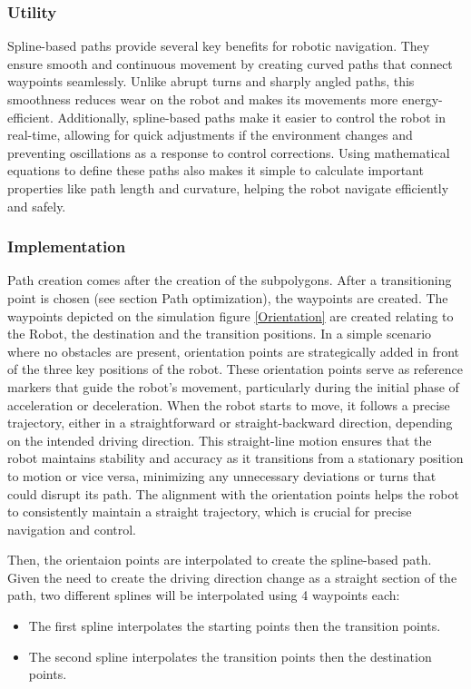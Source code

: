 \subsubsection{Utility}

Spline-based paths provide several key benefits for robotic navigation. They ensure smooth and continuous movement by 
creating curved paths that connect waypoints seamlessly. Unlike abrupt turns and sharply angled paths, this smoothness 
reduces wear on the robot and makes its movements more energy-efficient. Additionally, spline-based paths make it 
easier to control the robot in real-time, allowing for quick adjustments if the environment changes and preventing 
oscillations as a response to control corrections. Using mathematical 
equations to define these paths also makes it simple to calculate important 
properties like path length and curvature, helping the robot navigate efficiently and safely. 

\subsubsection{Implementation}

Path creation comes after the creation of the subpolygons. After a transitioning point is chosen (see section %
Path optimization), the waypoints are created. The waypoints depicted on the simulation figure \ref{Orientation} are created relating to the 
Robot, the destination and the transition positions. In a simple scenario where no obstacles are present, orientation points 
are strategically added in front of the three key positions of the robot. These orientation points serve as reference markers 
that guide the robot's movement, particularly during the initial phase of acceleration or deceleration. When the robot starts 
to move, it follows a precise trajectory, either in a straightforward or straight-backward direction, depending on the 
intended driving direction. This straight-line motion ensures that the robot maintains stability and accuracy as it 
transitions from a stationary position to motion or vice versa, minimizing any unnecessary deviations or turns that could 
disrupt its path. The alignment with the orientation points helps the robot to consistently maintain a straight trajectory, 
which is crucial for precise navigation and control.

Then, the orientaion points are interpolated to create the spline-based path. Given the need to create the driving direction 
change as a straight section of the path, two different splines will be interpolated using 4 waypoints each:
\begin{itemize}
    \item The first spline interpolates the starting points then the transition points.
    \item The second spline interpolates the transition points then the destination points.
\end{itemize}

